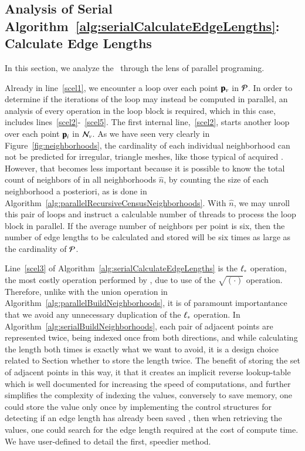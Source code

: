 %
%
\subsection{Analysis of Serial Algorithm~\ref{alg:serialCalculateEdgeLengths}: Calculate Edge Lengths}
\label{ch6sCELPssASACEL}
In this section, we analyze the~ through the lens of parallel programing.

Already in line~\ref{scel1}, we encounter a loop over each point $\mathbf{p}_v$ in $\mathcal{P}$. In order to determine if the iterations of the loop may instead be computed in parallel, an analysis of every operation in the loop block is required, which in this case, includes lines~\ref{scel2}-~\ref{scel5}. The first internal line,~\ref{scel2}, starts another loop over each point $\mathbf{p}_i$ in $\mathcal{N}_v$.  As we have seen very clearly in Figure~\ref{fig:neighborhoods}, the cardinality of each individual neighborhood can not be predicted for irregular, triangle meshes, like those typical of acquired \tdd{}. However, that becomes less important because it is possible to know the total count of neighbors of in all neighborhoods $\hat{n}$, by counting the size of each neighborhood a posteriori, as is done in Algorithm~\ref{alg:parallelRecursiveCensusNeighborhoods}. With $\hat{n}$, we may unroll this pair of loops and instruct a calculable number of threads to process the loop block in parallel. If the average number of neighbors per point is six, then the number of edge lengths to be calculated and stored will be six times as large as the cardinality of $\mathcal{P}$.

Line~\ref{scel3} of Algorithm~\ref{alg:serialCalculateEdgeLengths} is the $\ell_\ast$ operation, the most costly operation performed by , due to use of the $\sqrt{(\cdot)}$ operation. Therefore, unlike with the union operation in Algorithm~\ref{alg:parallelBuildNeighborhoods}, it is of paramount importantance that we avoid any unnecessary duplication of the $\ell_\ast$ operation. In Algorithm~\ref{alg:serialBuildNeighborhoods}, each pair of adjacent points are represented twice, being indexed once from both directions, and while calculating the length both times is exactly what we want to avoid, it is a design choice related to Section whether to store the length twice. The benefit of storing the set of adjacent points in this way, it that it creates an implicit reverse lookup-table which is well documented for increasing the speed of computations, and further simplifies the complexity of indexing the values, conversely to save memory, one could store the value only once by implementing the control structures for detecting if an edge length has already been saved , then when retrieving the values, one could search for the edge length required at the cost of compute time. We have user-defined to detail the first, speedier method.

